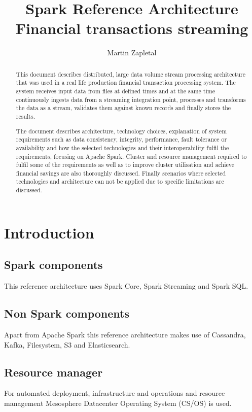 \documentclass[a4paper, 10 pt, conference]{IEEEtran}
\title{Spark Reference Architecture \\ Financial transactions streaming}
\author{Martin Zapletal%
}
\begin{document}
\maketitle
\thispagestyle{empty}
\pagestyle{empty}

\begin{abstract}
This document describes distributed, large data volume stream processing architecture that was used in a real life production financial transaction processing system. The system receives input data from files at defined times and at the same time continuously ingests data from a streaming integration point, processes and transforms the data as a stream, validates them against known records and finally stores the results.

The document describes architecture, technology choices, explanation of system requirements such as data consistency, integrity, performance, fault tolerance or availability and how the selected technologies and their interoperability fulfil the requirements, focusing on Apache Spark. Cluster and resource management required to fulfil some of the requirements as well as to improve cluster utilisation and achieve financial savings are also thoroughly discussed. Finally scenarios where selected technologies and architecture can not be applied due to specific limitations are discussed.
\end{abstract}


\section{Introduction}

\subsection{Spark components}
This reference architecture uses Spark Core, Spark Streaming and Spark SQL.

\subsection{Non Spark components}

Apart from Apache Spark this reference architecture makes use of Cassandra, Kafka, Filesystem, S3 and Elasticsearch.

\subsection{Resource manager}
For automated deployment, infrastructure and operations and resource management Mesosphere Datacenter Operating System (CS/OS) is used.
\end{document}
